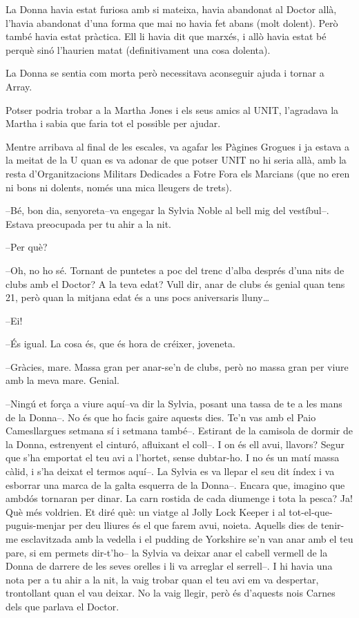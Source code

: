 La Donna havia estat furiosa amb si mateixa, havia abandonat al Doctor
allà, l'havia abandonat d'una forma que mai no havia fet abans (molt
dolent). Però també havia estat pràctica. Ell li havia dit que marxés, i
allò havia estat bé perquè sinó l'haurien matat (definitivament una cosa
dolenta).

La Donna se sentia com morta però necessitava aconseguir ajuda i tornar
a Array.

Potser podria trobar a la Martha Jones i els seus amics al UNIT,
l'agradava la Martha i sabia que faria tot el possible per ajudar.

Mentre arribava al final de les escales, va agafar les Pàgines Grogues i
ja estava a la meitat de la U quan es va adonar de que potser UNIT no hi
seria allà, amb la resta d'Organitzacions Militars Dedicades a Fotre
Fora els Marcians (que no eren ni bons ni dolents, només una mica
lleugers de trets).

--Bé, bon dia, senyoreta--va engegar la Sylvia Noble al bell mig del
vestíbul--. Estava preocupada per tu ahir a la nit.

--Per què?

--Oh, no ho sé. Tornant de puntetes a poc del trenc d'alba després d'una
nits de clubs amb el Doctor? A la teva edat? Vull dir, anar de clubs és
genial quan tens 21, però quan la mitjana edat és a uns pocs aniversaris
lluny\ldots{}

--Ei!

--És igual. La cosa és, que és hora de créixer, joveneta.

--Gràcies, mare. Massa gran per anar-se'n de clubs, però no massa gran
per viure amb la meva mare. Genial.

--Ningú et força a viure aquí--va dir la Sylvia, posant una tassa de te
a les mans de la Donna--. No és que ho facis gaire aquests dies. Te'n
vas amb el Paio Camesllargues setmana sí i setmana també--. Estirant de
la camisola de dormir de la Donna, estrenyent el cinturó, afluixant el
coll--. I on és ell avui, llavors? Segur que s'ha emportat el teu avi a
l'hortet, sense dubtar-ho. I no és un matí massa càlid, i s'ha deixat el
termos aquí--. La Sylvia es va llepar el seu dit índex i va esborrar una
marca de la galta esquerra de la Donna--. Encara que, imagino que ambdós
tornaran per dinar. La carn rostida de cada diumenge i tota la pesca?
Ja! Què més voldrien. Et diré què: un viatge al Jolly Lock Keeper i al
tot-el-que-puguis-menjar per deu lliures és el que farem avui, noieta.
Aquells dies de tenir-me esclavitzada amb la vedella i el pudding de
Yorkshire se'n van anar amb el teu pare, si em permets dir-t'ho-- la
Sylvia va deixar anar el cabell vermell de la Donna de darrere de les
seves orelles i li va arreglar el serrell--. I hi havia una nota per a
tu ahir a la nit, la vaig trobar quan el teu avi em va despertar,
trontollant quan el vau deixar. No la vaig llegir, però és d'aquests
nois Carnes dels que parlava el Doctor.

